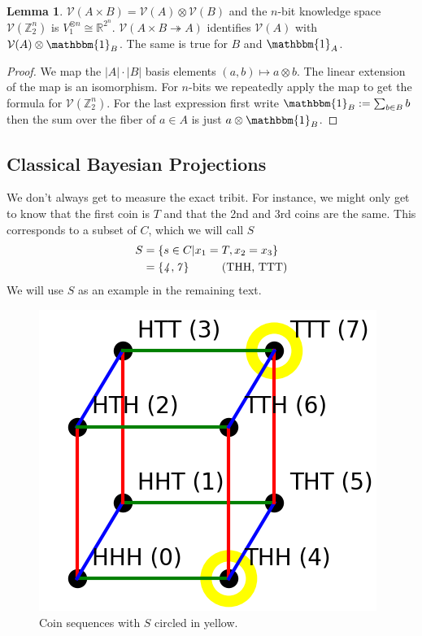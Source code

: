 \documentclass[12pt,a4paper]{article}
\theoremstyle{myrule}
\theoremstyle{postulate}
\theoremstyle{definition}
\newtheorem{lemma}[theorem]{Lemma}
\begin{document}
\begin{lemma}
\label{product}
  $\mathcal{V}(A \times B) = \mathcal{V}(A) \otimes \mathcal{V}(B)$ and the $n$-bit knowledge space $\mathcal{V}(\mathbb{Z}_2^n)$ is $V_1 ^ {\otimes n} \cong \mathbb{R}^{2^n}$.  $\mathcal{V}(A \times B \twoheadrightarrow A)$ identifies $\mathcal{V}(A)$ with $\mathcal{V}(A) \otimes \mathbbm{1}_B$.  The same is true for $B$ and $\mathbbm{1}_A$.
\end{lemma}
\begin{proof}
  We map the $|A|\cdot|B|$ basis elements $(a,b) \mapsto a \otimes b$.  The linear extension of the map is an isomorphism.  For $n$-bits we repeatedly apply the map to get the formula for $\mathcal{V}(\mathbb{Z}_2^n)$.  For the last expression first write $\mathbbm{1}_B := \sum_{b \in B} b$ then the sum over the fiber of $a \in A$ is just $a \otimes \mathbbm{1}_B$.
\end{proof}


\subsection{Classical Bayesian Projections}
\label{proj}
We don't always get to measure the exact tribit.  For instance, we might only get to know that the first coin is $T$ and that the 2nd and 3rd coins are the same.  This corresponds to a subset of $C$, which we will call $S$
\[
\begin{split}
  S &= \{s \in C | x_1 = T, x_2 = x_3 \} \\
    & = \{\mathit{4},\mathit{7}\} \hspace{0.4 in} \text{(THH, TTT)}
\end{split}
\]
We will use $S$ as an example in the remaining text.

\begin{figure}[h]
\centering
\includegraphics[scale=0.6]{cube.png}
\caption{Coin sequences with $S$ circled in yellow.}
\end{figure}
\end{document}
